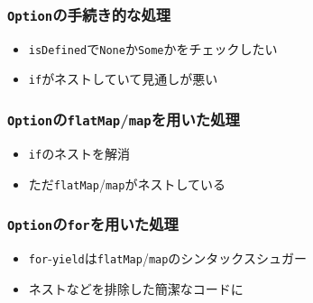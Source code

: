 \begin{frame}
  \begin{center}

  \end{center}
\end{frame}

\begin{frame}
  \frametitle{\protect\lstinline|Option|の手続き的な処理}


  \begin{itemize}
    \item<3-> \lstinline|isDefined|で\lstinline|None|か\lstinline|Some|かをチェックしたい
    \item<4-> \lstinline|if|がネストしていて見通しが悪い
  \end{itemize}
\end{frame}

\begin{frame}
  \frametitle{\protect\lstinline|Option|の\protect\lstinline|flatMap|/\lstinline|map|を用いた処理}


  \begin{itemize}
    \item<3-> \lstinline|if|のネストを解消
    \item<4-> ただ\lstinline|flatMap|/\lstinline|map|がネストしている
  \end{itemize}
\end{frame}

\begin{frame}
  \frametitle{\protect\lstinline|Option|の\protect\lstinline|for|を用いた処理}


  \begin{itemize}
    \item<3-> \lstinline|for|-\lstinline|yield|は\lstinline|flatMap|/\lstinline|map|のシンタックスシュガー
    \item<4-> ネストなどを排除した簡潔なコードに
  \end{itemize}
\end{frame}

